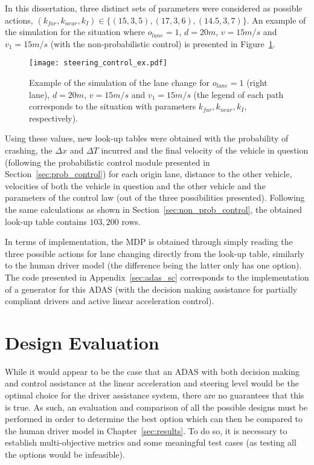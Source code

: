 In this dissertation, three distinct sets of parameters were considered as possible actions, $(k_{far}, k_{near},k_I) \in \{(15,3,5), (17,3,6), (14.5,3,7)\}$. An example of the simulation for the situation where $o_{lane} = 1$, $d = 20m$, $v = 15m/s$ and $v_1 = 15m/s$ (with the non-probabilistic control) is presented in Figure~\ref{fig:steering_control_ex}.

\begin{figure}[h]
    \centering
    \texttt{[image: steering\_control\_ex.pdf]}
    \caption{Example of the simulation of the lane change for $o_{lane} = 1$ (right lane), $d = 20m$, $v = 15m/s$ and $v_1 = 15m/s$ (the legend of each path corresponds to the situation with parameters $k_{far}, k_{near},k_I$, respectively).}
    \label{fig:steering_control_ex}
\end{figure}

Using these values, new look-up tables were obtained with the probability of crashing, the $\Delta x$ and $\Delta T$ incurred and the final velocity of the vehicle in question (following the probabilistic control module presented in Section~\ref{sec:prob_control}) for each origin lane, distance to the other vehicle, velocities of both the vehicle in question and the other vehicle and the parameters of the control law (out of the three possibilities presented). Following the same calculations as shown in Section~\ref{sec:non_prob_control}, the obtained look-up table contains $103,200$ rows.

In terms of implementation, the MDP is obtained through simply reading the three possible actions for lane changing directly from the look-up table, similarly to the human driver model (the difference being the latter only has one option). The code presented in Appendix~\ref{sec:adas_sc} corresponds to the implementation of a generator for this ADAS (with the decision making assistance for partially compliant drivers and active linear acceleration control).

\section{Design Evaluation}

While it would appear to be the case that an ADAS with both decision making and control assistance at the linear acceleration and steering level would be the optimal choice for the driver assistance system, there are no guarantees that this is true. As such, an evaluation and comparison of all the possible designs must be performed in order to determine the best option which can then be compared to the human driver model in Chapter~\ref{sec:results}. To do so, it is necessary to establish multi-objective metrics and some meaningful test cases (as testing all the options would be infeasible).

